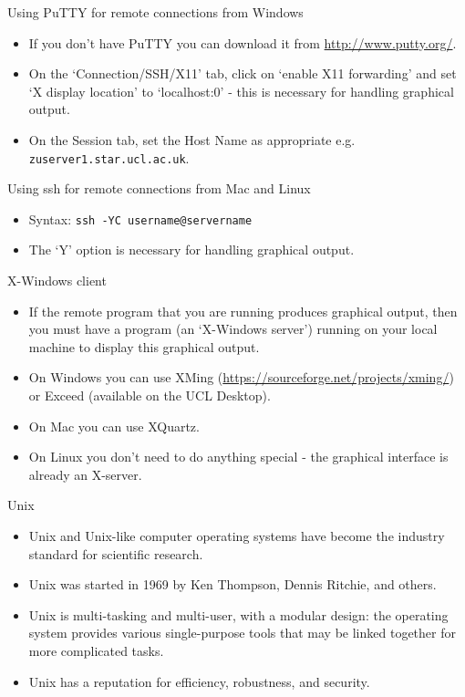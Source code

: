 \documentclass[dvipsnames]{beamer}
\newcommand{\command}[1]{\colorbox{light-gray}{\texttt{#1}}}
\newcommand{\server}[1]{\textcolor{BrickRed}{\texttt{#1}}}
\begin{document}
\begin{frame}{Using PuTTY for remote connections from Windows}
  \begin{itemize}
    \item If you don't have PuTTY you can download it from \url{http://www.putty.org/}.
    \item On the `Connection/SSH/X11' tab, click on `enable X11 forwarding' and set `X display location' to `localhost:0' - this is necessary for handling graphical output.
    \item On the Session tab, set the Host Name as appropriate e.g. \server{zuserver1.star.ucl.ac.uk}.
  \end{itemize}
\end{frame}


\begin{frame}{Using ssh for remote connections from Mac and Linux}
  \begin{itemize}
    \item Syntax: \command{ssh -YC username@servername}
    \item The `Y' option is necessary for handling graphical output.
  \end{itemize}
\end{frame}


\begin{frame}{X-Windows client}
  \begin{itemize}
    \item If the remote program that you are running produces graphical output, then you must have a program (an `X-Windows server') running on your local machine to display this graphical output.
    \item On Windows you can use XMing (\url{https://sourceforge.net/projects/xming/}) or Exceed (available on the UCL Desktop).
    \item On Mac you can use XQuartz.
    \item On Linux you don't need to do anything special - the graphical interface is already an X-server.
  \end{itemize}
\end{frame}


\begin{frame}{Unix}
  \begin{itemize}
    \item Unix and Unix-like computer operating systems have become the industry standard for scientific research.
    \item Unix was started in 1969 by Ken Thompson, Dennis Ritchie, and others.
    \item Unix is multi-tasking and multi-user, with a modular design: the operating system provides various single-purpose tools that may be linked together for more complicated tasks.
    \item Unix has a reputation for efficiency, robustness, and security.
   \end{itemize}
\end{frame}
\end{document}
